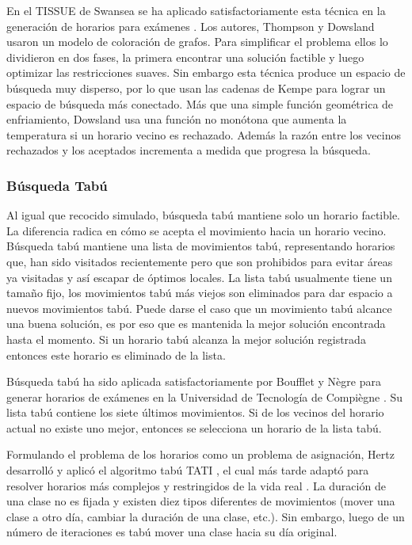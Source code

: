 En el TISSUE de Swansea se ha aplicado satisfactoriamente esta t\'ecnica en la generación de horarios para exámenes
\cite{J Thompson and KA Dowsland, J Thompson and KA Dowsland 2}. Los autores, Thompson y Dowsland usaron un modelo de coloración de grafos. Para simplificar el problema ellos lo dividieron en dos fases, la primera encontrar una solución factible y luego optimizar las restricciones suaves. Sin embargo esta t\'ecnica produce un espacio de búsqueda muy disperso, por lo que usan las cadenas de Kempe para lograr un espacio de búsqueda más conectado. Más que una simple función geom\'etrica de enfriamiento, Dowsland usa una función no monótona que aumenta la temperatura si un horario vecino es rechazado. Además la razón entre los vecinos rechazados y los aceptados incrementa a medida que progresa la búsqueda.

\subsubsection{Búsqueda Tab\'u}

Al igual que recocido simulado, búsqueda tab\'u mantiene solo un horario factible. La diferencia radica en cómo se acepta el movimiento hacia un horario vecino. Búsqueda tab\'u mantiene una lista de movimientos tab\'u, representando horarios que, han sido visitados recientemente pero que son prohibidos para evitar \'areas ya visitadas y así escapar de óptimos locales. La lista tab\'u usualmente tiene un tamaño fijo, los movimientos tab\'u más viejos son eliminados para dar espacio a nuevos movimientos tab\'u. Puede darse el caso que un movimiento tab\'u alcance una buena solución, es por eso que es mantenida la mejor solución encontrada hasta el momento. Si un horario tab\'u alcanza la mejor solución registrada entonces este horario es eliminado de la lista.

Búsqueda tab\'u ha sido aplicada satisfactoriamente por Boufflet y N\`egre para generar horarios de exámenes en la Universidad de Tecnología de Compi\`egne \cite{JP Boufflet and S Negre}. Su lista tab\'u contiene los siete últimos movimientos. Si de los vecinos del horario actual no existe uno mejor, entonces se selecciona un horario de la lista tab\'u.

Formulando el problema de los horarios como un problema de asignación, Hertz desarrolló y aplicó el algoritmo tab\'u TATI \cite{A Hertz}, el cual más tarde adaptó para resolver horarios más complejos y restringidos de la vida real \cite{A Hertz 2}. La duración de una clase no es fijada y existen diez tipos diferentes de movimientos (mover una clase a otro día, cambiar la duración de una clase, etc.). Sin embargo, luego de un número de iteraciones es tab\'u mover una clase hacia su día original.

